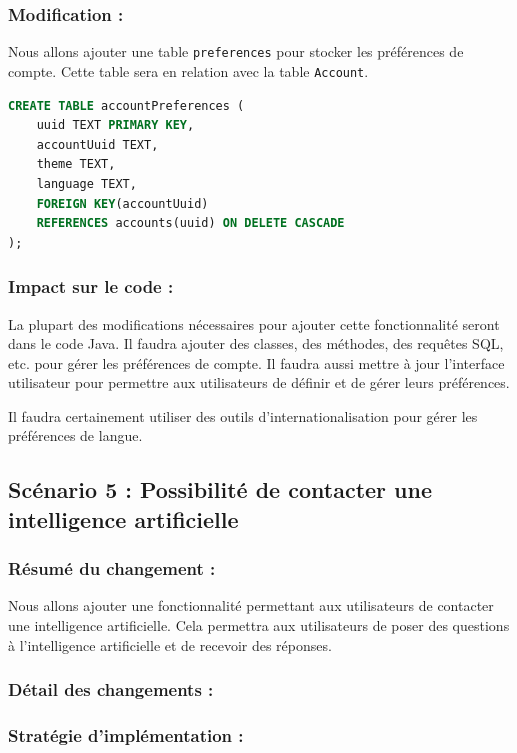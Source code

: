 \documentclass[a4paper,11pt]{article}
\begin{document}
\subsubsection*{Modification :}

Nous allons ajouter une table \texttt{preferences} pour stocker les préférences de compte. Cette table sera en relation avec la table \texttt{Account}.

\begin{lstlisting}[language=SQL]
CREATE TABLE accountPreferences (
	uuid TEXT PRIMARY KEY,
	accountUuid TEXT,
	theme TEXT,
	language TEXT,
	FOREIGN KEY(accountUuid) 
	REFERENCES accounts(uuid) ON DELETE CASCADE
);
\end{lstlisting}

\subsubsection*{Impact sur le code :}

La plupart des modifications nécessaires pour ajouter cette fonctionnalité seront dans le code Java. Il faudra ajouter des classes, des méthodes, des requêtes SQL, etc. pour gérer les préférences de compte. Il faudra aussi mettre à jour l'interface utilisateur pour permettre aux utilisateurs de définir et de gérer leurs préférences.

Il faudra certainement utiliser des outils d'internationalisation pour gérer les préférences de langue.

\subsection*{Scénario 5 : Possibilité de contacter une intelligence artificielle}

\subsubsection*{Résumé du changement :}

Nous allons ajouter une fonctionnalité permettant aux utilisateurs de contacter une intelligence artificielle. Cela permettra aux utilisateurs de poser des questions à l'intelligence artificielle et de recevoir des réponses.

\subsubsection*{Détail des changements :}

\subsubsection*{Stratégie d'implémentation :}
\end{document}
